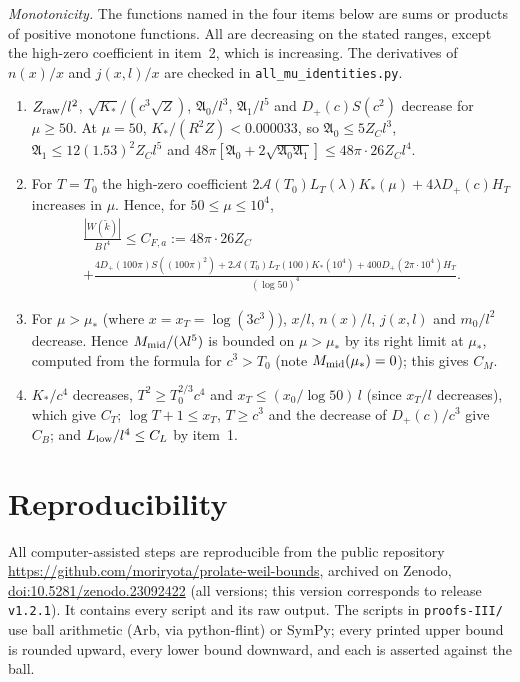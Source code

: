 \documentclass[11pt]{amsart}
\newcommand{\doi}[1]{\href{https://doi.org/#1}{doi:#1}}
\theoremstyle{remark}
\numberwithin{equation}{section}
\begin{document}
\emph{Monotonicity.} The functions named in the four items below are sums or products of positive monotone functions. All are decreasing on the stated ranges, except the high-zero coefficient in item~2, which is increasing. The derivatives of $n(x)/x$ and $j(x,l)/x$ are checked in \texttt{all\_mu\_identities.py}.
\begin{enumerate}
\item $Z_{\rm raw}/l^2$, $\sqrt{K_*}/(c^3\sqrt Z)$, $\mathfrak A_0/l^3$, $\mathfrak A_1/l^5$ and $D_+(c)S(c^2)$ decrease for $\mu\ge50$. At $\mu=50$, $K_*/(R^2Z)<0.000033$, so $\mathfrak A_0\le5Z_Cl^3$, $\mathfrak A_1\le12(1.53)^2Z_Cl^5$ and $48\pi[\mathfrak A_0+2\sqrt{\mathfrak A_0\mathfrak A_1}]\le48\pi\cdot26Z_Cl^4$.
\item For $T=T_0$ the high-zero coefficient $2\mathcal A(T_0)L_T(\lambda)K_*(\mu)+4\lambda D_+(c)H_T$ increases in $\mu$. Hence, for $50\le\mu\le10^4$,
\begin{multline}\label{eq:CFa}
\frac{|W(\tilde k)|}{B\,l^4}\le C_{F,a}:=48\pi\cdot26Z_C\\+\frac{4D_+(100\pi)S((100\pi)^2)+2\mathcal A(T_0)L_T(100)K_*(10^4)+400D_+(2\pi\cdot10^4)H_T}{(\log50)^4}.
\end{multline}
\item For $\mu>\mu_*$ (where $x=x_T=\log(3c^3)$), $x/l$, $n(x)/l$, $j(x,l)$ and $m_0/l^2$ decrease. Hence $M_{\rm mid}/(\lambda l^5)$ is bounded on $\mu>\mu_*$ by its right limit at $\mu_*$, computed from the formula for $c^3>T_0$ (note $M_{\rm mid}(\mu_*)=0$); this gives $C_M$.
\item $K_*/c^4$ decreases, $T^2\ge T_0^{2/3}c^4$ and $x_T\le(x_0/\log50)\,l$ (since $x_T/l$ decreases), which give $C_T$; $\log T+1\le x_T$, $T\ge c^3$ and the decrease of $D_+(c)/c^3$ give $C_B$; and $L_{\rm low}/l^4\le C_L$ by item~1.
\end{enumerate}

\section*{Reproducibility}
All computer-assisted steps are reproducible from the public repository \url{https://github.com/moriryota/prolate-weil-bounds}, archived on Zenodo, \doi{10.5281/zenodo.23092422} (all versions; this version corresponds to release \texttt{v1.2.1}). It contains every script and its raw output. The scripts in \texttt{proofs-III/} use ball arithmetic (Arb, via python-flint) or SymPy; every printed upper bound is rounded upward, every lower bound downward, and each is asserted against the ball.
\end{document}
